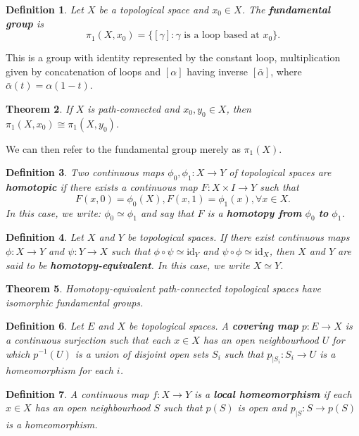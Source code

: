 \documentclass{article}
\newtheorem{theorem}{Theorem}[section]
\newtheorem{definition}[theorem]{Definition}
\begin{document}
\begin{definition}
Let $X$ be a topological space and $x_0\in X$. The \textbf{fundamental group} is \[\pi_1(X,x_0)=\{[\gamma]:\gamma\text{ is a loop based at }x_0\}.\]
\end{definition}
\noindent This is a group with identity represented by the constant loop, multiplication given by concatenation of loops and $[\alpha]$ having inverse $[\bar \alpha]$, where $\bar \alpha(t)=\alpha(1-t)$.

\begin{theorem}
If $X$ is path-connected and $x_0,y_0\in X$, then $\pi_1(X,x_0)\cong\pi_1(X,y_0)$.
\end{theorem}
\noindent We can then refer to the fundamental group merely as $\pi_1(X)$.

\begin{definition}
Two continuous maps $\phi_0,\phi_1\colon X\to Y$ of topological spaces are \textbf{homotopic} if there exists a continuous map $F\colon X\times I\to Y$ such that\[F(x,0)=\phi_0(X), F(x,1)=\phi_1(x),\forall x\in X.\]
In this case, we write: $\phi_0\simeq\phi_1$ and say that $F$ is a \textbf{homotopy from} $\phi_0$ \textbf{to} $\phi_1$.
\end{definition}



\begin{definition}
Let $X$ and $Y$ be topological spaces. If there exist continuous maps $\phi\colon X\to Y$ and $\psi\colon Y\to X$ such that $\phi\circ\psi\simeq\text{id}_Y$ and $\psi\circ\phi\simeq\text{id}_X$, then $X$ and $Y$ are said to be \textbf{homotopy-equivalent}. In this case, we write $X\simeq Y$.
\end{definition}

\begin{theorem}
Homotopy-equivalent path-connected topological spaces have isomorphic fundamental groups.
\end{theorem}

\begin{definition}
Let $E$ and $X$ be topological spaces. A \textbf{covering map} $p:E\to X$ is a continuous surjection such that each $x\in X$ has an open neighbourhood $U$ for which $p^{-1}(U)$ is a union of disjoint open sets $S_i$ such that $p_{|S_i}:S_i\to U$ is a homeomorphism for each $i$.
\end{definition}

\begin{definition}
A continuous map $f:X\to Y$ is a \textbf{local homeomorphism} if each $x\in X$ has an open neighbourhood $S$ such that $p(S)$ is open and $p_{|S}:S\to p(S)$ is a homeomorphism.
\end{definition}
\end{document}
